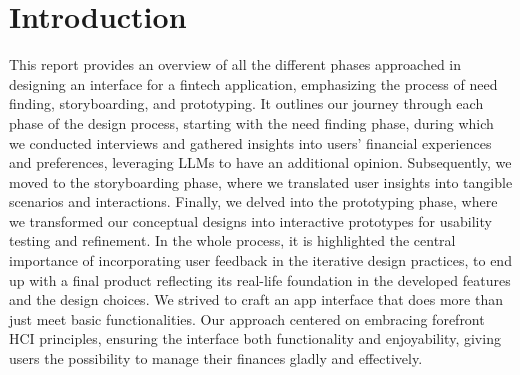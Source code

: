 \section{Introduction}
This report provides an overview of all the different phases approached in designing an interface for a fintech application, emphasizing the process of need finding, storyboarding, and prototyping.
It outlines our journey through each phase of the design process, starting with the need finding phase, during which we conducted interviews and gathered insights into users' financial experiences and preferences, leveraging LLMs to have an additional opinion. Subsequently, we moved to the storyboarding phase, where we translated user insights into tangible scenarios and interactions. Finally, we delved into the prototyping phase, where we transformed our conceptual designs into interactive prototypes for usability testing and refinement.
In the whole process, it is highlighted the central importance of incorporating user feedback in the iterative design practices, to end up with a final product reflecting its real-life foundation in the developed features and the design choices. We strived to craft an app interface that does more than just meet basic functionalities. Our approach centered on embracing forefront HCI principles, ensuring the interface both functionality and enjoyability, giving users the possibility to manage their finances gladly and effectively.
